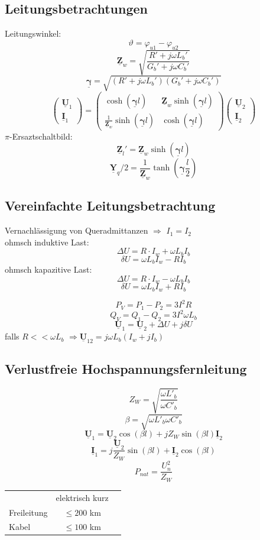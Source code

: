 \documentclass[9pt,a4paper]{scrartcl}
\renewcommand{\vec}[1]{\ensuremath{\underline{\boldsymbol {#1}}}}
\newcommand{\Ra}[0]{\ensuremath{\Rightarrow}}									%
\begin{document}
\begin{multicols}{3}
		\subsection{Leitungsbetrachtungen}
		Leitungswinkel: 
		\[\vartheta = \varphi_{u1} - \varphi_{u2}\]
		\[\vec Z_w = \sqrt{\frac{R' + j \omega L_b'}{G_b' + j \omega C_b'}}\]
		\[\vec \gamma = \sqrt{(R' + j \omega L_b')(G_b' + j \omega C_b')}\]
		\[\begin{pmatrix} \vec U_1 \\ \vec I_1 \end{pmatrix} = \begin{pmatrix} \cosh(\vec \gamma l) & \vec Z_w \sinh(\vec \gamma l) \\ \frac{1}{\vec Z_w} \sinh(\vec \gamma l) & \cosh(\vec \gamma l) \end{pmatrix} \begin{pmatrix} \vec U_2 \\ \vec I_2 \end{pmatrix}\]
		$\pi$-Ersaztschaltbild:
		\[\vec Z_l' = \vec Z_w \sinh(\vec \gamma l)\]
		\[\vec Y_q / 2 = \frac{1}{\vec Z_w} \tanh(\vec \gamma \frac{l}{2})\]

		\subsection{Vereinfachte Leitungsbetrachtung}		
		Vernachlässigung von Queradmittanzen $\Ra$ $I_{1} = I_{2}$ \\
		ohmsch induktive Last:
		\[\Delta U = R \cdot I_w + \omega L_b I_b\]
		\[\delta U = \omega L_b I_w - R I_b\]
		ohmsch kapazitive Last:
		\[\Delta U = R \cdot I_w - \omega L_b I_b\]
		\[\delta U = \omega L_b I_w + R I_b\]
		
		\[P_V = P_1 - P_2 = 3 I^2 R\]
		\[Q_V = Q_1 - Q_2 = 3 I^2 \omega L_b\]
		\[\vec U_1 = \vec U_2 + \Delta U + j \delta U\]
		falls $R << \omega L_b$ \quad $\Ra \vec U_{12} = j \omega L_b (I_w + j I_b)$
		
		\subsection{Verlustfreie Hochspannungsfernleitung}		
		\[Z_W = \sqrt{\frac{\omega L'_b}{\omega C'_b}}\]
		\[\beta = \sqrt{\omega L'_b \omega C'_b}\]
		\[\vec U_1 = \vec U_2 \cos (\beta l) + j Z_W \sin (\beta l) \vec I_2\]
		\[\vec I_1 = j \frac{\vec U_2}{Z_W} \sin (\beta l) + \vec I_2 \cos (\beta l)\]
		\[P_{nat} = \frac{U_n^2}{Z_W}\]		
		\begin{tabular}{lcc}
		 & elektrisch kurz \\
		Freileitung & $\le 200$ km \\
		Kabel & $\le 100$ km
		\end{tabular}	
			

\end{multicols}
\end{document}
